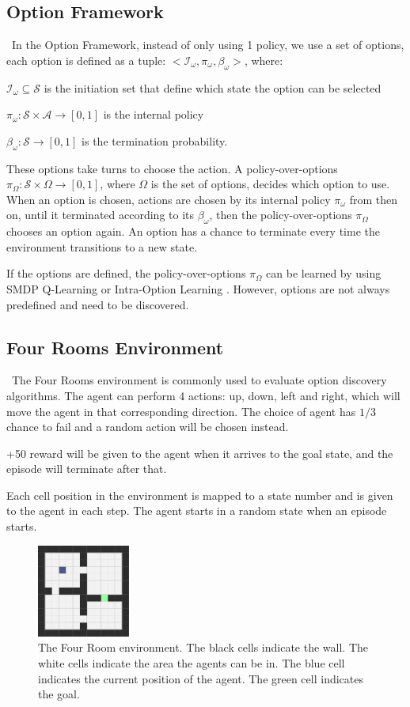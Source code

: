 \documentclass{article}
\begin{document}
	\subsection*{Option Framework}
	\qquad \ In the Option Framework\cite{SUTTON1999181}, instead of only using 1 policy, we use a set of options, each option is defined as a tuple: $<\mathcal{I}_\omega,\pi_\omega,\beta_\omega>$, where:
	
	\qquad $\mathcal{I}_\omega \subseteq \mathcal{S}$ is the initiation set that define which state the option can be selected
	
	\qquad $\pi_\omega : \mathcal{S} \times \mathcal{A} \rightarrow [0,1]$ is the internal policy
	
	\qquad $\beta_\omega:\mathcal{S} \rightarrow [0,1]$ is the termination probability.
	
	\quad These options take turns to choose the action. A policy-over-options $\pi_\Omega : \mathcal{S} \times \Omega \rightarrow [0,1]$, where $\Omega$ is the set of options, decides which option to use. When an option is chosen, actions are chosen by its internal policy $\pi_\omega$ from then on, until it terminated according to its $\beta_\omega$, then the policy-over-options $\pi_\Omega$ chooses an option again. An option has a chance to terminate every time the environment transitions to a new state.
	
	\quad If the options are defined, the policy-over-options $\pi_\Omega$ can be learned by using SMDP Q-Learning \cite{smdp} or Intra-Option Learning \cite{intraoplearn}. However, options are not always predefined and need to be discovered.
	\subsection*{Four Rooms Environment}
	\qquad \ The Four Rooms environment \cite{ocrepo} is commonly used to evaluate option discovery algorithms. The agent can perform 4 actions: up, down, left and right, which will move the agent in that corresponding direction. The choice of agent has $1/3$ chance to fail and a random action will be chosen instead.
	
	\quad +50 reward will be given to the agent when it arrives to the goal state, and the episode will terminate after that.
	
	\quad Each cell position in the environment is mapped to a state number and is given to the agent in each step. The agent starts in a random state when an episode starts.
	\begin{figure}[h]
		\centering
		\includegraphics[width=1.2in]{4Rooms.png}
		\caption{The Four Room environment. The black cells indicate the wall. The white cells indicate the area the agents can be in. The blue cell indicates the current position of the agent. The green cell indicates the goal.}
	\end{figure}
\end{document}
